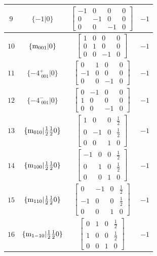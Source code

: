 \documentclass[fleqn,8pt]{jsarticle}
\begin{document}
\begin{longtable}{cccc}
$ 9 $ & $ \{-1|0\} $ & $ \begin{bmatrix} -1 & 0 & 0 & 0 \\ 0 & -1 & 0 & 0 \\ 0 & 0 & -1 & 0 \end{bmatrix} $ & $ -1 $ \\ \hline
$ 10 $ & $ \{{\rm m}_{001}|0\} $ & $ \begin{bmatrix} 1 & 0 & 0 & 0 \\ 0 & 1 & 0 & 0 \\ 0 & 0 & -1 & 0 \end{bmatrix} $ & $ -1 $ \\ \hline
$ 11 $ & $ \{-4^{+}_{\,\,001}|0\} $ & $ \begin{bmatrix} 0 & 1 & 0 & 0 \\ -1 & 0 & 0 & 0 \\ 0 & 0 & -1 & 0 \end{bmatrix} $ & $ -1 $ \\ \hline
$ 12 $ & $ \{-4^{-}_{\,\,001}|0\} $ & $ \begin{bmatrix} 0 & -1 & 0 & 0 \\ 1 & 0 & 0 & 0 \\ 0 & 0 & -1 & 0 \end{bmatrix} $ & $ -1 $ \\ \hline
$ 13 $ & $ \{{\rm m}_{010}|\frac{1}{2} \frac{1}{2} 0\} $ & $ \begin{bmatrix} 1 & 0 & 0 & \frac{1}{2} \\ 0 & -1 & 0 & \frac{1}{2} \\ 0 & 0 & 1 & 0 \end{bmatrix} $ & $ -1 $ \\ \hline
$ 14 $ & $ \{{\rm m}_{100}|\frac{1}{2} \frac{1}{2} 0\} $ & $ \begin{bmatrix} -1 & 0 & 0 & \frac{1}{2} \\ 0 & 1 & 0 & \frac{1}{2} \\ 0 & 0 & 1 & 0 \end{bmatrix} $ & $ -1 $ \\ \hline
$ 15 $ & $ \{{\rm m}_{110}|\frac{1}{2} \frac{1}{2} 0\} $ & $ \begin{bmatrix} 0 & -1 & 0 & \frac{1}{2} \\ -1 & 0 & 0 & \frac{1}{2} \\ 0 & 0 & 1 & 0 \end{bmatrix} $ & $ -1 $ \\ \hline
$ 16 $ & $ \{{\rm m}_{1-10}|\frac{1}{2} \frac{1}{2} 0\} $ & $ \begin{bmatrix} 0 & 1 & 0 & \frac{1}{2} \\ 1 & 0 & 0 & \frac{1}{2} \\ 0 & 0 & 1 & 0 \end{bmatrix} $ & $ -1 $ \\
\end{longtable}
\end{document}
